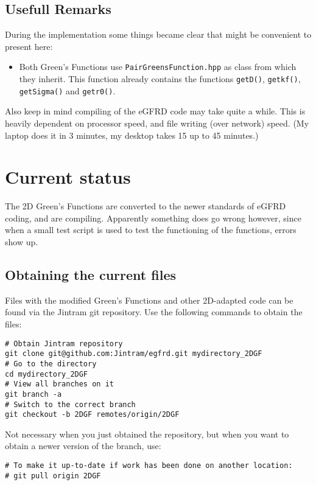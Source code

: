 \documentclass[a4paper,10pt]{article}
\begin{document}
\subsection{Usefull Remarks}

During the implementation some things became clear that might be convenient to present here:
\begin{itemize}
\item Both Green's Functions use \verb|PairGreensFunction.hpp| as class from which they inherit. This function already contains the functions \verb|getD()|, \verb|getkf()|, \verb|getSigma()| and \verb|getr0()|.
\end{itemize}

Also keep in mind compiling of the eGFRD code may take quite a while. This is heavily dependent on processor speed, and file writing (over network) speed. (My laptop does it in 3 minutes, my desktop takes 15 up to 45 minutes.)

\section{Current status}
\label{section:currentstatus}

The 2D Green's Functions are converted to the newer standards of eGFRD coding, and are compiling. Apparently something does go wrong however, since when a small test script is used to test the functioning of the functions, errors show up.

\subsection{Obtaining the current files}

Files with the modified Green's Functions and other 2D-adapted code can be found via the Jintram git repository. Use the following commands to obtain the files:

\begin{verbatim}
# Obtain Jintram repository
git clone git@github.com:Jintram/egfrd.git mydirectory_2DGF
# Go to the directory
cd mydirectory_2DGF
# View all branches on it
git branch -a
# Switch to the correct branch
git checkout -b 2DGF remotes/origin/2DGF
\end{verbatim}

Not necessary when you just obtained the repository, but when you want to obtain a newer version of the branch, use:

\begin{verbatim}
# To make it up-to-date if work has been done on another location:
# git pull origin 2DGF
\end{verbatim}
\end{document}
